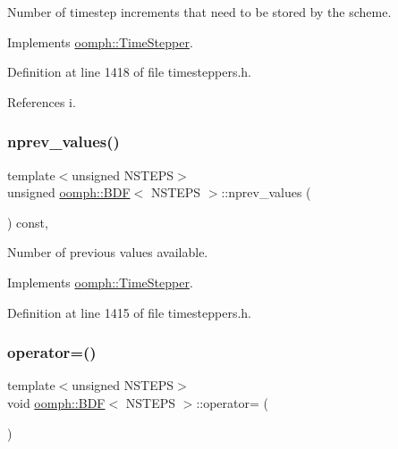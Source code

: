 Number of timestep increments that need to be stored by the scheme. 



Implements \hyperlink{classoomph_1_1TimeStepper_a00e57b6436cff4fc82af481b81a78a1a}{oomph\+::\+Time\+Stepper}.



Definition at line 1418 of file timesteppers.\+h.



References i.

\mbox{\label{classoomph_1_1BDF_ae6fac2faf065b8abf2afff64b63874f6}} 
\subsubsection{\texorpdfstring{nprev\+\_\+values()}{nprev\_values()}}
{\footnotesize\ttfamily template$<$unsigned N\+S\+T\+E\+PS$>$ \\
unsigned \hyperlink{classoomph_1_1BDF}{oomph\+::\+B\+DF}$<$ N\+S\+T\+E\+PS $>$\+::nprev\+\_\+values (\begin{DoxyParamCaption}{ }\end{DoxyParamCaption}) const\hspace{0.3cm}{\ttfamily [inline]}, {\ttfamily [virtual]}}



Number of previous values available. 



Implements \hyperlink{classoomph_1_1TimeStepper_a0f38713ed304c18d9f7b5cf8131664c1}{oomph\+::\+Time\+Stepper}.



Definition at line 1415 of file timesteppers.\+h.

\mbox{\label{classoomph_1_1BDF_aa9061eca9649de9fee2567b882b258ce}} 
\subsubsection{\texorpdfstring{operator=()}{operator=()}}
{\footnotesize\ttfamily template$<$unsigned N\+S\+T\+E\+PS$>$ \\
void \hyperlink{classoomph_1_1BDF}{oomph\+::\+B\+DF}$<$ N\+S\+T\+E\+PS $>$\+::operator= (\begin{DoxyParamCaption}\item[{const \hyperlink{classoomph_1_1BDF}{B\+DF}$<$ N\+S\+T\+E\+PS $>$ \&}]{ }\end{DoxyParamCaption})\hspace{0.3cm}{\ttfamily [inline]}}




